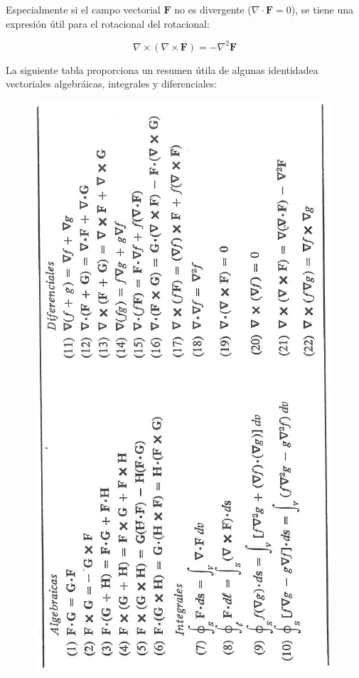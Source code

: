Especialmente si el campo vectorial $\mathbf{F}$ no es divergente ($\nabla \cdot \mathbf{F} = 0$), se tiene una expresión útil para el rotacional del rotacional:

\begin{equation*}
\nabla \times (\nabla \times \mathbf{F}) = - \nabla^2 \mathbf{F}
\end{equation*}

La siguiente tabla proporciona un resumen útila de algunas identidadea vectoriales algebráicas, integrales y diferenciales:

\begin{figure}[H]
    \centering
    \includegraphics[scale=0.7, angle=-90]{Waves/waves_f4.png}
\end{figure}

